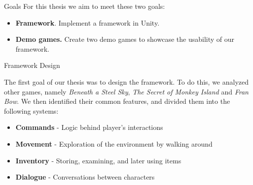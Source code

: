 \documentclass[portrait,a0paper,fontscale=0.35]{baposter}
\begin{document}
\begin{poster}
\begin{posterbox}[column=0, span=1, name=goals, below=background, headerColorOne=cyan!40, boxColorOne=cyan!10]{Goals}
For this thesis we aim to meet these two goals:
\begin{itemize}
\setlength\itemsep{0.05em}
\item \textbf{Framework}. Implement a framework in Unity.
\item \textbf{Demo games.} Create two demo games to showcase the usability of our framework.
\end{itemize}

\end{posterbox}

\begin{posterbox}[column=0, span=1, name=architecture, below=goals]{Framework Design}

The first goal of our thesis was to design the framework. To do this, we analyzed other games,
namely \textit{Beneath a Steel Sky}, \textit{The Secret of Monkey Island} and \textit{Fran Bow}. We then identified their common features, and divided them into the following systems:
\begin{itemize}
\setlength\itemsep{0.05em}
    \item \textbf{Commands} - Logic behind player's interactions
    \item \textbf{Movement} - Exploration of the environment by walking around
    \item \textbf{Inventory} - Storing, examining, and later using items
    \item \textbf{Dialogue} - Conversations between characters
\end{itemize}

\end{posterbox}


\end{poster}
\end{document}
